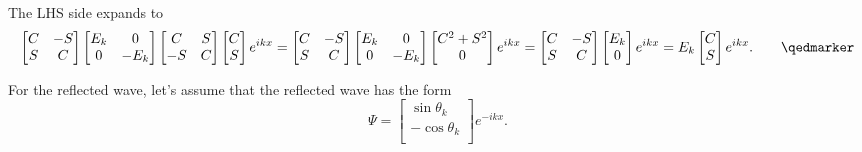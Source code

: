 {The LHS side expands to
\begin{dmath}\label{eqn:qmLecture9Problems:660}
\begin{bmatrix}
C & - S \\
S & C
\end{bmatrix}
\begin{bmatrix}
E_k & 0 \\
0 & -E_k
\end{bmatrix}
\begin{bmatrix}
C & S \\
-S & C
\end{bmatrix}
\begin{bmatrix}
C \\
S \\
\end{bmatrix}
e^{i k x}
=
\begin{bmatrix}
C & - S \\
S & C
\end{bmatrix}
\begin{bmatrix}
E_k & 0 \\
0 & -E_k
\end{bmatrix}
\begin{bmatrix}
C^2 + S^2 \\
0 \\
\end{bmatrix}
e^{i k x}
=
\begin{bmatrix}
C & - S \\
S & C
\end{bmatrix}
\begin{bmatrix}
E_k \\
0
\end{bmatrix}
e^{i k x}
=
E_k
\begin{bmatrix}
C \\
S
\end{bmatrix}
e^{i k x}. \qquad \qedmarker
\end{dmath}


For the reflected wave, let's assume that the reflected wave has the form
%
\begin{dmath}\label{eqn:qmLecture9Problems:680}
\Psi =
\begin{bmatrix}
\sin\theta_k \\
-\cos\theta_k \\
\end{bmatrix}
e^{-i k x }.
\end{dmath}

}

